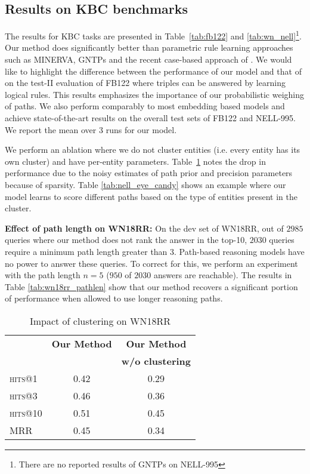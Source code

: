 \documentclass[11pt,a4paper]{article}
\newcommand{\fb}{FB122\xspace}
\newcommand{\nell}{NELL-995\xspace}
\newcommand{\wn}{WN18RR\xspace}
\begin{document}
\subsection{Results on KBC benchmarks}
\label{sub:kbc}
The results for KBC tasks are presented in Table~\ref{tab:fb122} and \ref{tab:wn_nell}\footnote{There are no reported results of GNTPs on \nell}. Our method does significantly better than parametric rule learning approaches such as MINERVA, GNTPs and the recent case-based approach of \citet{cbr}. We would like to highlight the difference between the performance of our model and that of \citet{cbr} on the test-II evaluation of \fb where triples can be answered by learning logical rules. This results emphasizes the importance of our probabilistic weighing of paths. We also perform comparably to most embedding based models and achieve state-of-the-art results on the overall test sets of \fb and \nell. We report the mean over 3 runs for our model.

We perform an ablation where we do not cluster entities (i.e. every entity has its own cluster) and have per-entity parameters. 
Table~\ref{tab:wn18rr_clustering} notes the drop in performance due to the noisy estimates of path prior and precision parameters because of sparsity. Table \ref{tab:nell_eye_candy} shows an example where our model learns to score different paths based on the type of entities present in the cluster.

\textbf{Effect of path length on \wn:} On the dev set of WN18RR, out of $2985$ queries where our method does not rank the answer in the top-10, $2030$ queries require a minimum path length greater than 3. Path-based reasoning models have no power to answer these queries. To correct for this, we perform an experiment with the path length $n=5$ ($950$ of $2030$ answers are reachable). The results in Table \ref{tab:wn18rr_pathlen} show that our method recovers a significant portion of performance when allowed to use longer reasoning paths.

\begin{table}
\centering
\small
\begin{tabular}{ l  c c}
\toprule
& \textbf{Our Method} & \textbf{Our Method}   \\ 
&  & \bf w/o clustering   \\
\midrule
  \textsc{hits}@1 & 0.42 & 0.29\\
  \textsc{hits}@3  & 0.46 & 0.36\\
  \textsc{hits}@10  & 0.51 & 0.45\\
  \textsc{MRR}   & 0.45 & 0.34\\
\bottomrule
\end{tabular}
\vspace{-2mm}
\caption{Impact of clustering on WN18RR}
\label{tab:wn18rr_clustering}
\end{table}
\end{document}
